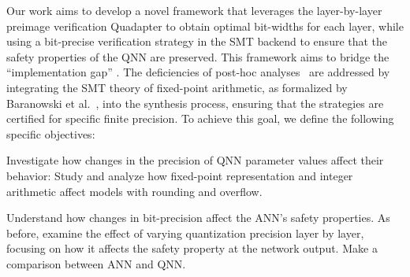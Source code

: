 {Our work aims to develop a novel framework that leverages the layer-by-layer preimage verification Quadapter to obtain optimal bit-widths for each layer, while using a bit-precise verification strategy in the SMT backend to ensure that the safety properties of the QNN are preserved. This framework aims to bridge the ``implementation gap'' \cite{cordeiro2025neuralnetworkverificationprogramming}. The deficiencies of post-hoc analyses~\cite{giacobbe2020how} are addressed by integrating the SMT theory of fixed-point arithmetic, as formalized by Baranowski et al.~\cite{baranowski2020smt}, into the synthesis process, ensuring that the strategies are certified for specific finite precision. To achieve this goal, we define the following specific objectives:}

Investigate how changes in the precision of QNN parameter values affect their behavior: Study and analyze how fixed-point representation and integer arithmetic affect models with rounding and overflow.

Understand how changes in bit-precision affect the ANN's safety properties. As before, examine the effect of varying quantization precision layer by layer, focusing on how it affects the safety property at the network output. Make a comparison between ANN and QNN.

